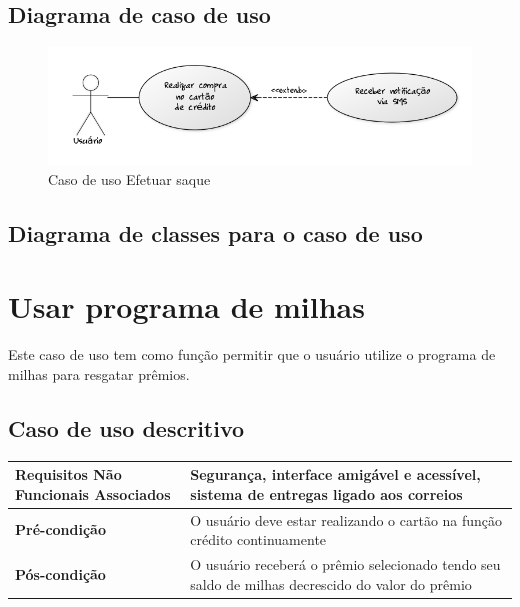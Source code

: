 \subsection{Diagrama de caso de uso}

\begin{figure}[!htb]
     \centering
     \includegraphics[scale=0.6]{diagramas/caso-de-uso/imagens/receberNotificacaoSms.png}
     \caption{Caso de uso Efetuar saque}
\end{figure}

\subsection{Diagrama de classes para o caso de uso}

\section{Usar programa de milhas}

Este caso de uso tem como função permitir que o usuário utilize o programa de milhas para resgatar prêmios.

\subsection{Caso de uso descritivo}

\begin{table}[h]
  \centering
  \begin{tabular}{|p{4cm} | p{10cm} |}
      \hline
      \small{\textbf{Requisitos Não Funcionais Associados}}	& Segurança, interface amigável e acessível, sistema de entregas ligado aos correios	\\ \hline
      \small{\textbf{Pré-condição}}	&	O usuário deve estar realizando o cartão na função crédito continuamente	\\ \hline
      \small{\textbf{Pós-condição}}	&	O usuário receberá o prêmio selecionado tendo seu saldo de milhas decrescido do valor do prêmio	\\ \hline
    \end{tabular}
\end{table}

